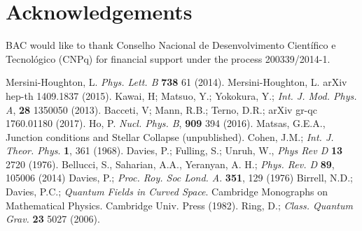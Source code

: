 \documentclass[reprint,amsmath,amssymb,aps,nofootinbib]{revtex4-1}
\begin{document}
\section{Acknowledgements}
BAC would like to thank Conselho Nacional de Desenvolvimento Cient\'ifico e Tecnol\'ogico (CNPq) for financial support under the process 200339/2014-1.

\begin{thebibliography}{1}
 Mersini-Houghton, L. \emph{Phys. Lett. B} \textbf{738} 61 (2014).
 Mersini-Houghton, L. arXiv hep-th 1409.1837 (2015).
 Kawai, H; Matsuo, Y.; Yokokura, Y.; \emph{Int. J. Mod. Phys. A}, \textbf{28} 1350050 (2013).
 Bacceti, V; Mann, R.B.; Terno, D.R.; arXiv gr-qc 1760.01180 (2017).
 Ho, P. \emph{Nucl. Phys. B}, \textbf{909} 394 (2016).
 Matsas, G.E.A., Junction conditions and Stellar Collapse (unpublished).
 Cohen, J.M.; \emph{Int. J. Theor. Phys}. \textbf{1}, 361 (1968).
 Davies, P.; Fulling, S.; Unruh, W., \emph{Phys Rev D} \textbf{13} 2720 (1976).
 Bellucci, S., Saharian, A.A., Yeranyan, A. H.; \emph{Phys. Rev. D} \textbf{89}, 105006 (2014)
 Davies, P.; \emph{Proc. Roy. Soc Lond. A}. \textbf{351}, 129 (1976)
 Birrell, N.D.; Davies, P.C.; \emph{Quantum Fields in Curved Space}. Cambridge Monographs on Mathematical Physics. Cambridge Univ. Press (1982).
 Ring, D.; \emph{Class. Quantum Grav.} \textbf{23} 5027 (2006).
\end{thebibliography}

\end{document}
